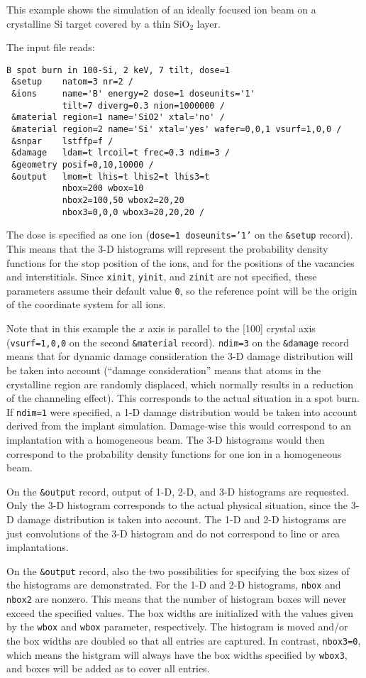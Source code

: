 This example shows the simulation of an ideally focused ion beam on a
crystalline Si target covered by a thin SiO$_2$ layer.

The input file reads:

\begin{verbatim}
B spot burn in 100-Si, 2 keV, 7 tilt, dose=1
 &setup    natom=3 nr=2 / 
 &ions     name='B' energy=2 dose=1 doseunits='1'
           tilt=7 diverg=0.3 nion=1000000 /
 &material region=1 name='SiO2' xtal='no' /
 &material region=2 name='Si' xtal='yes' wafer=0,0,1 vsurf=1,0,0 /
 &snpar    lstffp=f /
 &damage   ldam=t lrcoil=t frec=0.3 ndim=3 /
 &geometry posif=0,10,10000 /
 &output   lmom=t lhis=t lhis2=t lhis3=t 
           nbox=200 wbox=10
           nbox2=100,50 wbox2=20,20 
           nbox3=0,0,0 wbox3=20,20,20 /
\end{verbatim}

The dose is specified as one ion (\texttt{dose=1 doseunits='1'} on the
\texttt{\&setup} record). This means that the 3-D histograms will represent the
probability density functions for the stop position of the ions, and for the
positions of the vacancies and interstitials. Since \texttt{xinit},
\texttt{yinit}, and \texttt{zinit} are not specified, these parameters assume
their default value \texttt{0}, so the reference point will be the origin of the
coordinate system for all ions.

Note that in this example the $x$ axis is parallel to the [100] crystal axis
(\texttt{vsurf=1,0,0} on the second \texttt{\&material} record).
\texttt{ndim=3} on the \texttt{\&damage} record means that for dynamic damage
consideration the 3-D damage distribution will be taken into account (``damage
consideration'' means that atoms in the crystalline region are randomly
displaced, which normally results in a reduction of the channeling effect).
This corresponds to the actual situation in a spot burn. If \texttt{ndim=1} were
specified, a 1-D damage distribution would be taken into account derived from
the implant simulation. Damage-wise this would correspond to an implantation
with a homogeneous beam. The 3-D histograms would then correspond to the
probability density functions for one ion in a homogeneous beam.

On the \texttt{\&output} record, output of 1-D, 2-D, and 3-D histograms are
requested. Only the 3-D histogram corresponds to the actual physical situation,
since the 3-D damage distribution is taken into account. The 1-D and 2-D
histograms are just convolutions of the 3-D histogram and do not correspond to
line or area implantations.

On the \texttt{\&output} record, also the two possibilities for specifying the
box sizes of the histograms are demonstrated. For the 1-D and 2-D histograms,
\texttt{nbox} and \texttt{nbox2} are nonzero. This means that the number of
histogram boxes will never exceed the specified values. The box widths are
initialized with the values given by the \texttt{wbox} and \texttt{wbox}
parameter, respectively. The histogram is moved and/or the box widths are
doubled so that all entries are captured. In contrast, \texttt{nbox3=0}, which
means the histgram will always have the box widths specified by \texttt{wbox3},
and boxes will be added as to cover all entries.
